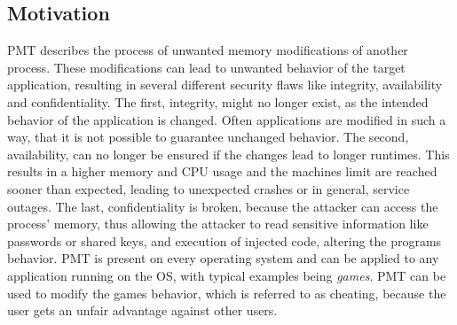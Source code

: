\subsection{Motivation}
\gls{PMT} describes the process of unwanted memory modifications of another process. These modifications can lead to unwanted behavior of the target application, resulting in several different security flaws like integrity, availability and confidentiality. The first, integrity, might no longer exist, as the intended behavior of the application is changed. Often applications are modified in such a way, that it is not possible to guarantee unchanged behavior. The second, availability, can no longer be ensured if the changes lead to longer runtimes. This results in a higher memory and CPU usage and the machines limit are reached sooner than expected, leading to unexpected crashes or in general, service outages. The last, confidentiality is broken, because the attacker can access the process' memory, thus allowing the attacker to read sensitive information like passwords or shared keys, and execution of injected code, altering the programs behavior. \gls{PMT} is present on every operating system and can be applied to any application running on the OS, with typical examples being \emph{games}. \gls{PMT} can be used to modify the games behavior, which is referred to as cheating, because the user gets an unfair advantage against other users.
